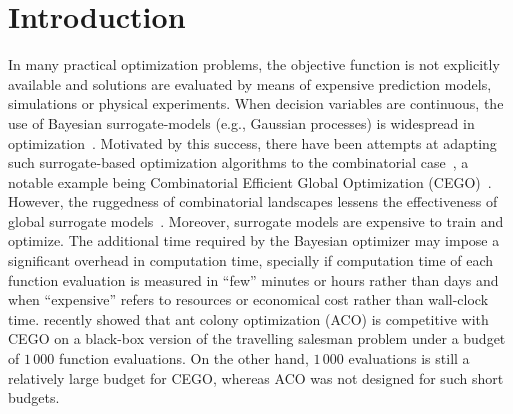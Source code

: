 \documentclass[sigconf,dvipsnames]{acmart}
\begin{document}


\maketitle



\section{Introduction}

In many practical optimization problems, the objective function is not
explicitly available and solutions are evaluated by means of expensive
prediction models, simulations or physical experiments. When decision variables
are continuous, the use of Bayesian surrogate-models (e.g., Gaussian processes)
is widespread in
optimization~\citep{JonSchWel98go,ForKea2009surrogate}. Motivated by this
success, there have been attempts at adapting such surrogate-based optimization
algorithms to the combinatorial case~\cite{MorKat2011:evo}, a notable example being Combinatorial
Efficient Global Optimization
(CEGO)~\citep{ZaeStoBar2014:ppsn,ZaeStoFriFisNauBar2014}. However, the
ruggedness of combinatorial landscapes lessens the effectiveness of global
surrogate models~\citep{EriPeaGar2019scalable}. Moreover, surrogate models are
expensive to train and optimize. The additional time required by the Bayesian
optimizer may impose a significant overhead in computation time, specially if
computation time of each function evaluation is measured in ``few'' minutes or
hours rather than days and when ``expensive'' refers to resources or economical
cost rather than wall-clock time. \citet{PerLopStu2015si} recently showed that
ant colony optimization (ACO) %
is competitive with CEGO
on a black-box version of the travelling salesman problem under a budget of
$1\,000$ function evaluations.  On the other hand, $1\,000$ evaluations is
still a relatively large budget for CEGO, whereas ACO was not designed for such
short budgets.
\end{document}

